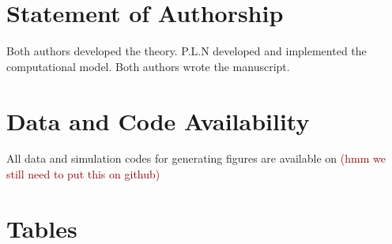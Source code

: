 \documentclass[11pt]{article}
\newcommand{\cha}[1]{\textcolor{darkred}{(#1)}}
\begin{document}
 \section*{Statement of Authorship}
Both authors developed the theory.
P.L.N developed and implemented the computational model.
Both authors wrote the manuscript.
 
\section*{Data and Code Availability}
All data and simulation codes for generating figures are available on 
\cha{hmm we still need to put this on github}
%
%
%
%
%
%
\newpage{}

%
%




\newpage{}

\section*{Tables}
\renewcommand{\thetable}{\arabic{table}}
\setcounter{table}{0}
\end{document}
